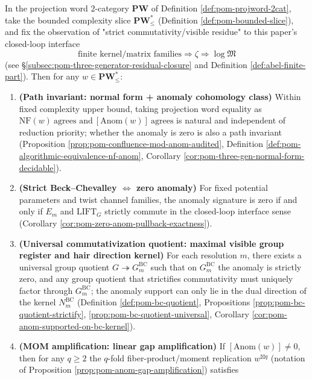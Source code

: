 \begin{theorem}\label{thm:dephys-offline-hair-curvature-reduction}
In the projection word \(2\)-category \(\mathbf{PW}\) of Definition \ref{def:pom-projword-2cat}, take the bounded complexity slice \(\mathbf{PW}^{\ast}_{\le}\) (Definition \ref{def:pom-bounded-slice}), and fix the observation of "strict commutativity/visible residue" to this paper's closed-loop interface
\[
\text{finite kernel/matrix families}\Rightarrow \zeta \Rightarrow \log\mathfrak{M}
\]
(see \S\ref{subsec:pom-three-generator-residual-closure} and Definition \ref{def:abel-finite-part}).
Then for any \(w\in\mathbf{PW}^{\ast}_{\le}\):
\begin{enumerate}
  \item \textbf{(Path invariant: normal form + anomaly cohomology class)}
  Within fixed complexity upper bound, taking projection word equality as
  \(
  \mathrm{NF}(w)\ \text{agrees and}\ [\mathrm{Anom}(w)]\ \text{agrees}
  \)
  is natural and independent of reduction priority; whether the anomaly is zero is also a path invariant
  (Proposition \ref{prop:pom-confluence-mod-anom-audited}, Definition \ref{def:pom-algorithmic-equivalence-nf-anom}, Corollary \ref{cor:pom-three-gen-normal-form-decidable}).
  \item \textbf{(Strict Beck--Chevalley \texorpdfstring{$\Longleftrightarrow$}{<->} zero anomaly)}
  For fixed potential parameters and twist channel families, the anomaly signature is zero if and only if
  \(E_m\) and \(\mathrm{LIFT}_G\) strictly commute in the closed-loop interface sense (Corollary \ref{cor:pom-zero-anom-pullback-exactness}).
  \item \textbf{(Universal commutativization quotient: maximal visible group register and hair direction kernel)}
  For each resolution \(m\), there exists a universal group quotient \(G\twoheadrightarrow G^{\mathrm{BC}}_m\) such that on \(G^{\mathrm{BC}}_m\) the anomaly is strictly zero,
  and any group quotient that strictifies commutativity must uniquely factor through \(G^{\mathrm{BC}}_m\); the anomaly support can only lie in the dual direction of the kernel \(N^{\mathrm{BC}}_m\)
  (Definition \ref{def:pom-bc-quotient}, Propositions \ref{prop:pom-bc-quotient-strictify}, \ref{prop:pom-bc-quotient-universal}, Corollary \ref{cor:pom-anom-supported-on-bc-kernel}).
  \item \textbf{(MOM amplification: linear gap amplification)}
  If \([\mathrm{Anom}(w)]\neq 0\), then for any \(q\ge 2\) the \(q\)-fold fiber-product/moment replication \(w^{\boxtimes q}\) (notation of Proposition \ref{prop:pom-anom-gap-amplification}) satisfies

\end{enumerate}
\end{theorem}
